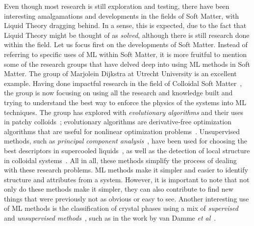 Even though most research is still exploration and testing, there have been interesting
amalgamations and developments in the fields of Soft Matter, with Liquid Theory dragging
behind. In a sense, this is expected, due to the fact that Liquid Theory might be thought
of as \emph{solved}, although there is still research done within the field.
Let us focus first on the developments of Soft Matter. Instead of referring to specific
uses of ML within Soft Matter, it is more fruitful to mention some of the research groups
that have delved deep into using ML methods in Soft Matter. The group of Marjolein
Dijkstra at Utrecht University is an excellent example. Having done impactful research
in the field of Colloidal Soft Matter~\cite{dijkstraPhaseDiagramHighly1999,leunissenIonicColloidalCrystals2005},
the group is now focusing on using all the research and knowledge built and trying to
understand the best way to enforce the physics of the systems into ML techniques.
The group has explored with \emph{evolutionary algorithms} and their uses in patchy
colloids~\cite{bianchiPredictingPatchyParticle2012}; evolutionary algorithms are
derivative-free optimization algorithms that are useful for nonlinear optimization
problems~\cite{yuIntroductionEvolutionaryAlgorithms2010}.
Unsupervised methods, such as \emph{principal component analysis}~\cite{hastieElementsStatisticalLearning2009},
have been used for choosing the best descriptors in supercooled liquids~\cite{boattiniAveragingLocalStructure2021},
as well as the detection of local structure in colloidal systems~\cite{boattiniUnsupervisedLearningLocal2019a}.
All in all, these methods simplify the process of dealing with these research problems.
ML methods make it simpler and easier to identify structure and attributes from a
system. However, it is important to note that not only do these methods make it simpler,
they can also contribute to find new things that were previously not as obvious or easy
to see.
Another interesting use of ML methods is the classification of crystal phases using
a mix of \emph{supervised} and \emph{unsupervised methods}~\cite{hastieElementsStatisticalLearning2009},
such as in the work by van Damme \emph{et al}~\cite{vandammeClassifyingCrystalsRounded2020}.


